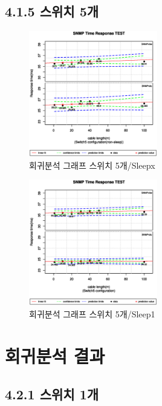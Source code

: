 \documentclass[11pt
  , a4paper
  , article
  , oneside
]{memoir}
\begin{document}
\subsection{4.1.5 스위치 5개}
 \begin{figure}[!htb]
  \centering
  \includegraphics[width=0.5\textwidth]{./images/s5sx.eps}
  \caption{회귀분석 그래프 스위치 5개/Sleepx} 
\end{figure}
 \begin{figure}[!htb]
  \centering
  \includegraphics[width=0.5\textwidth]{./images/s5s1.eps}
  \caption{회귀분석 그래프 스위치 5개/Sleep1}
\end{figure}


\clearpage
\section{회귀분석 결과}\label{txt:result}  
\subsection{4.2.1 스위치 1개}
\end{document}
